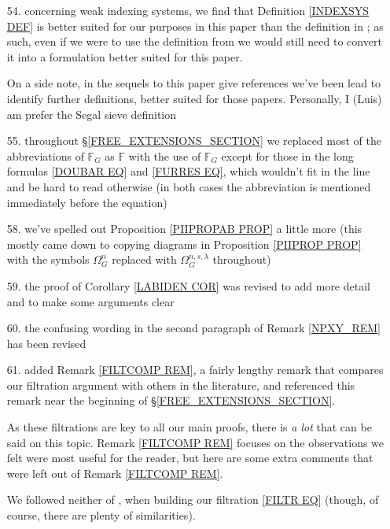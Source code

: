 \documentclass{article}
\begin{document}
\begin{itemize}
	\item[54.] concerning weak indexing systems,
	we find that Definition \ref{INDEXSYS DEF}
	is better suited for our purposes in this paper than 
	the definition in \cite{Pe17}; as such, even if we were to use the definition from \cite{Pe17} we would still need to convert it into a formulation better suited for this paper.
	
	On a side note, in the sequels to this paper 
	{\color{red} give references}
	we've been lead to identify further definitions,
	better suited for those papers.
	Personally, I (Luis) am prefer the Segal sieve definition
	
	
	\item[55.] throughout \S \ref{FREE_EXTENSIONS_SECTION}
	we replaced most of the abbreviations of
	$\mathbb{F}_G$ as $\mathbb{F}$ with the use of $\mathbb{F}_G$
	except for those in the long formulas
	\eqref{DOUBAR EQ} and \eqref{FURRES EQ},
	which wouldn't fit in the line and be hard to read otherwise
	(in both cases the abbreviation is mentioned immediately before the equation)

	\item[58.]
	we've spelled out Proposition \ref{PIIPROPAB PROP}
	a little more (this mostly came down to copying
	diagrams in Proposition \ref{PIIPROP PROP}
	with the symbols 
	$\Omega^n_G$
	replaced with 
	$\Omega^{n,s,\lambda}_{G}$ throughout)
	
	\item[59.] the proof of Corollary \ref{LABIDEN COR}
	was revised to add more detail and to make
	some arguments clear

	\item[60.]
	the confusing wording in the second paragraph of 
	Remark \ref{NPXY_REM} has been revised

	\item[61.] added Remark \ref{FILTCOMP REM},
	a fairly lengthy remark that compares our filtration argument with others in the literature, and referenced this remark near the beginning of \S \ref{FREE_EXTENSIONS_SECTION}. 

	As these filtrations are key to all our main proofs,
	there is \emph{a lot} that can be said on this topic.
	Remark \ref{FILTCOMP REM} focuses on the observations we felt
	were most useful for the reader,
	but here are some extra comments that were left out of 
	Remark \ref{FILTCOMP REM}.
	
	We followed neither of \cite{BM03},\cite{BB17} 
	when building our filtration \eqref{FILTR EQ}
	(though, of course, there are plenty of similarities).
	

\end{itemize}
\end{document}
